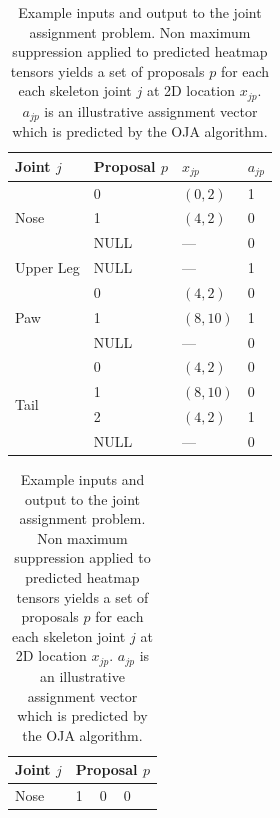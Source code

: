 \begin{table}
    \RawFloats
    \parbox{.48\linewidth}{
        \strut
        \centering
        \begin{tabular}{@{}llll@{}}
        \toprule
        Joint $j$               & Proposal $p$ & $x_{jp}$ & $a_{jp}$ \\ 
        \midrule
        \multirow{3}{*}{Nose} & 0          & $(0, 2) $   & 1 \\
                            & 1          & $(4, 2) $   & 0 \\
                            & NULL       & ---         & 0 \\
        \midrule
        Upper Leg             & NULL       & ---         & 1 \\
        \midrule
        \multirow{3}{*}{Paw}  & 0          & $(4, 2)$    & 0 \\
                            & 1          & $(8, 10)$   & 1 \\
                            & NULL       & ---         & 0 \\
        \midrule
        \multirow{4}{*}{Tail} & 0          & $(4, 2)$    & 0 \\
                            & 1          & $(8, 10)$   & 0 \\
                            & 2          & $(4, 2)$    & 1 \\
                            & NULL       & ---         & 0 \\
        \bottomrule
        \end{tabular}
        \caption{Example inputs and output to the joint assignment problem. Non maximum suppression applied to predicted heatmap tensors yields a set of proposals $p$ for each each skeleton joint $j$ at 2D location $x_{jp}$. $a_{jp}$ is an illustrative assignment vector which is predicted by the OJA algorithm.}
        \label{tab:oja-example-inputs}
    }
    \hfill
    \parbox{.48\linewidth}{
        \strut
        \centering
        \parbox{\linewidth}{
            \strut
            \centering
            \begin{tabular}{@{}lllll@{}}
            \toprule
            Joint $j$ & \multicolumn{4}{l}{Proposal $p$}                                                 \\
            \midrule
            Nose      & 1 & 0                        & 0                        & \cellcolor[HTML]{808080} \\

\end{tabular}}}
\end{table}
